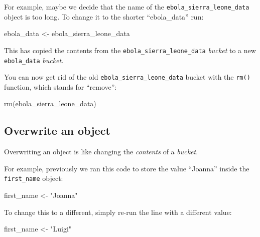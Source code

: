 \documentclass[
  letterpaper,
  DIV=11,
  numbers=noendperiod]{scrreprt}
\newenvironment{Shaded}{\begin{snugshade}}{\end{snugshade}}
\newcommand{\FunctionTok}[1]{\textcolor[rgb]{0.28,0.35,0.67}{#1}}
\newcommand{\NormalTok}[1]{\textcolor[rgb]{0.00,0.23,0.31}{#1}}
\newcommand{\OtherTok}[1]{\textcolor[rgb]{0.00,0.23,0.31}{#1}}
\newcommand{\StringTok}[1]{\textcolor[rgb]{0.13,0.47,0.30}{#1}}
\begin{document}
For example, maybe we decide that the name of the
\texttt{ebola\_sierra\_leone\_data} object is too long. To change it to
the shorter ``ebola\_data'' run:

\begin{Shaded}
\begin{Highlighting}[]
\NormalTok{ebola\_data }\OtherTok{\textless{}{-}}\NormalTok{ ebola\_sierra\_leone\_data}
\end{Highlighting}
\end{Shaded}

This has copied the contents from the
\texttt{ebola\_sierra\_leone\_data} \emph{bucket} to a new
\texttt{ebola\_data} \emph{bucket}.

You can now get rid of the old \texttt{ebola\_sierra\_leone\_data}
bucket with the \texttt{rm()} function, which stands for ``remove'':

\begin{Shaded}
\begin{Highlighting}[]
\FunctionTok{rm}\NormalTok{(ebola\_sierra\_leone\_data)}
\end{Highlighting}
\end{Shaded}

\hypertarget{overwrite-an-object}{%
\subsection{Overwrite an object}\label{overwrite-an-object}}

Overwriting an object is like changing the \emph{contents} of a
\emph{bucket}.

For example, previously we ran this code to store the value ``Joanna''
inside the \texttt{first\_name} object:

\begin{Shaded}
\begin{Highlighting}[]
\NormalTok{first\_name }\OtherTok{\textless{}{-}} \StringTok{"Joanna"}
\end{Highlighting}
\end{Shaded}

To change this to a different, simply re-run the line with a different
value:

\begin{Shaded}
\begin{Highlighting}[]
\NormalTok{first\_name }\OtherTok{\textless{}{-}} \StringTok{"Luigi"}
\end{Highlighting}
\end{Shaded}
\end{document}
